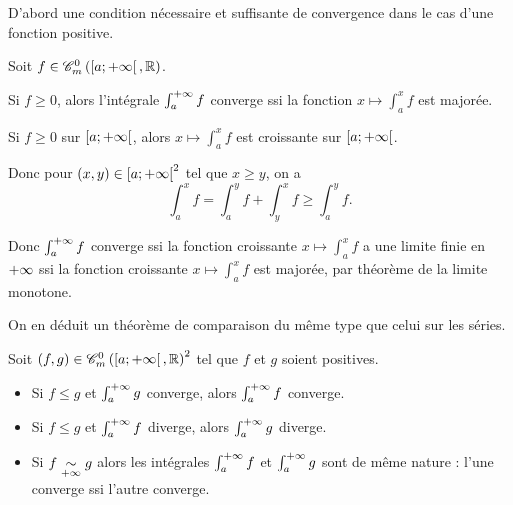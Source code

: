 D'abord une condition nécessaire et suffisante de convergence dans le cas d'une fonction positive.

\begin{prop}
Soit \(f\in\contm[\intervie{a}{\pinf}][\R]\).

Si \(f\geq0\), alors l'intégrale \(\int_a^{+\infty}f\) converge ssi la fonction \(x\mapsto\int_a^xf\) est majorée.
\end{prop}

\begin{dem}
Si \(f\geq0\) sur \(\left[a;+\infty\right[\), alors \(x\mapsto\int_a^xf\) est croissante sur \(\left[a;+\infty\right[\).

Donc pour \(\left(x,y\right)\in\left[a;+\infty\right[^2\) tel que \(x\geq y\), on a \[\int_a^xf=\int_a^yf+\int_y^xf\geq\int_a^yf.\]

Donc \(\int_a^{+\infty}f\) converge ssi la fonction croissante \(x\mapsto\int_a^xf\) a une limite finie en \(+\infty\) ssi la fonction croissante \(x\mapsto\int_a^xf\) est majorée, par théorème de la limite monotone.
\end{dem}

On en déduit un théorème de comparaison du même type que celui sur les séries.

\begin{theo}
Soit \(\paren{f,g}\in\contm[\intervie{a}{\pinf}][\R]^2\) tel que \(f\) et \(g\) soient positives.

\begin{itemize}
    \item Si \(f\leq g\) et \(\int_a^{+\infty}g\) converge, alors \(\int_a^{+\infty}f\) converge. \\
    \item Si \(f\leq g\) et \(\int_a^{+\infty}f\) diverge, alors \(\int_a^{+\infty}g\) diverge. \\
    \item Si \(f\underset{+\infty}{\sim}g\) alors les intégrales \(\int_a^{+\infty}f\) et \(\int_a^{+\infty}g\) sont de même nature : l'une converge ssi l'autre converge.
\end{itemize}
\end{theo}

